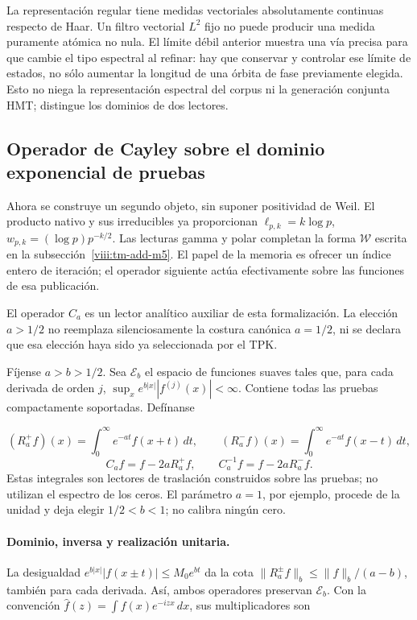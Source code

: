 La representación regular tiene medidas vectoriales absolutamente continuas respecto de Haar. Un filtro vectorial \(L^2\) fijo no puede producir una medida puramente atómica no nula. El límite débil anterior muestra una vía precisa para que cambie el tipo espectral al refinar: hay que conservar y controlar ese límite de estados, no sólo aumentar la longitud de una órbita de fase previamente elegida. Esto no niega la representación espectral del corpus ni la generación conjunta HMT; distingue los dominios de dos lectores.


\subsection{Operador de Cayley sobre el dominio exponencial de pruebas}
\label{viii:tm-add-m4}
Ahora se construye un segundo objeto, sin suponer positividad de Weil. El producto nativo y sus irreducibles ya proporcionan \(\ell_{p,k}=k\log p\), \(w_{p,k}=(\log p)p^{-k/2}\). Las lecturas gamma y polar completan la forma \(\mathscr W\) escrita en la subsección~\ref{viii:tm-add-m5}. El papel de la memoria es ofrecer un índice entero de iteración; el operador siguiente actúa efectivamente sobre las funciones de esa publicación.

El operador \(C_a\) es un lector analítico auxiliar de esta formalización. La elección \(a>1/2\) no reemplaza silenciosamente la costura canónica \(a=1/2\), ni se declara que esa elección haya sido ya seleccionada por el TPK.

Fíjense \(a>b>1/2\). Sea \(\mathscr E_b\) el espacio de funciones suaves tales que, para cada derivada de orden \(j\), \(\sup_x e^{b|x|}|f^{(j)}(x)|<\infty\). Contiene todas las pruebas compactamente soportadas. Defínanse

\[
(R_a^+f)(x)=\int_0^\infty e^{-at}f(x+t)\,dt,
\qquad
(R_a^-f)(x)=\int_0^\infty e^{-at}f(x-t)\,dt,
\]
\[
\boxed{C_af=f-2aR_a^+f,\qquad C_a^{-1}f=f-2aR_a^-f.}
\]
Estas integrales son lectores de traslación construidos sobre las pruebas; no utilizan el espectro de los ceros. El parámetro \(a=1\), por ejemplo, procede de la unidad y deja elegir \(1/2<b<1\); no calibra ningún cero.

\paragraph{Dominio, inversa y realización unitaria.} La desigualdad \(e^{b|x|}|f(x\pm t)|\le M_0e^{bt}\) da la cota \(\|R_a^\pm f\|_b\le\|f\|_b/(a-b)\), también para cada derivada. Así, ambos operadores preservan \(\mathscr E_b\). Con la convención \(\widehat f(z)=\int f(x)e^{-izx}\,dx\), sus multiplicadores son

